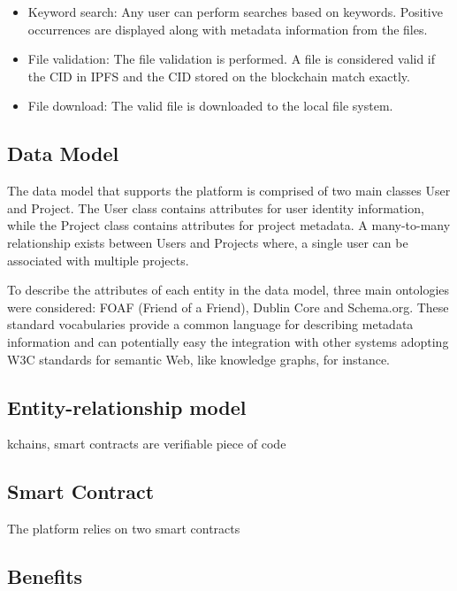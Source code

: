 \documentclass{article}
\begin{document}
\begin{itemize}
      \item Keyword search:
            \indent Any user can perform searches based on keywords. Positive occurrences are displayed along with metadata information from the files.

      \item File validation:
            \indent The file validation is performed. A file is considered valid if the CID in IPFS and the CID stored on the blockchain match exactly.

      \item File download:
            \indent The valid file is downloaded to the local file system.
\end{itemize}



\subsection{Data Model}

The data model that supports the platform is comprised of two main classes User and Project. The User class contains attributes for user identity information, while the Project class contains attributes for project metadata. A many-to-many relationship exists between Users and Projects where, a single user can be associated with multiple projects.

To describe the attributes of each entity in the data model, three main ontologies were considered: FOAF (Friend of a Friend), Dublin Core and Schema.org. These standard vocabularies provide a common language for describing metadata information and can potentially easy the integration with other systems adopting W3C standards for semantic Web, like knowledge graphs, for instance.

\subsection{Entity-relationship model}


kchains, smart contracts are verifiable piece of code


\subsection{Smart Contract}

The platform relies on two smart contracts


\subsection{Benefits}
\end{document}
